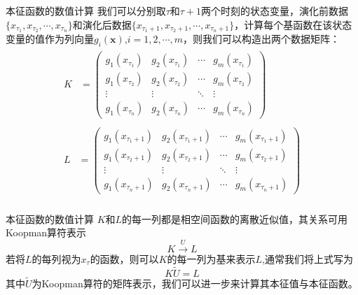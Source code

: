 \documentclass{beamer}
\begin{document}
     	\begin{frame}{本征函数的数值计算}
     		我们可以分别取$\tau$和$\tau+1$两个时刻的状态变量，演化前数据$\{x_{\tau_1},x_{\tau_2},\cdots,x_{\tau_n}\}$和演化后数据$\{x_{\tau_1+1},x_{\tau_2+1},\cdots,x_{\tau_n+1}\}$，计算每个基函数在该状态变量的值作为列向量${g_i(\mathbf{x})}$,$i=1,2,\cdots,m$，则我们可以构造出两个数据矩阵：
     		\begin{gather}
     			\begin{aligned}
     			K&=\begin{pmatrix}
     			g_1(x_{\tau_1})&g_2(x_{\tau_1})&\cdots&g_m(x_{\tau_1})\\
     			g_1(x_{\tau_2})&g_2(x_{\tau_2})&\cdots&g_m(x_{\tau_2})\\
     			\vdots&\vdots&\ddots&\vdots\\
     			g_1(x_{\tau_n})&g_2(x_{\tau_n})&\cdots&g_m(x_{\tau_n})
     			\end{pmatrix}
     			\end{aligned}\\
     			\begin{aligned}
     			L&=\begin{pmatrix}
     			g_1(x_{\tau_1+1})&g_2(x_{\tau_1+1})&\cdots&g_m(x_{\tau_1+1})\\
     			g_1(x_{\tau_2+1})&g_2(x_{\tau_2+1})&\cdots&g_m(x_{\tau_2+1})\\
     			\vdots&\vdots&\ddots&\vdots\\
     			g_1(x_{\tau_n+1})&g_2(x_{\tau_n+1})&\cdots&g_m(x_{\tau_n+1})
     			\end{pmatrix}\\
     			\end{aligned}
     		\end{gather}
     	\end{frame}
     	\begin{frame}{本征函数的数值计算}
     		$K$和$L$的每一列都是相空间函数的离散近似值，其关系可用Koopman算符表示
     		$$K\stackrel{U}{\longrightarrow}L$$
     		若将$L$的每列视为$x_\tau$的函数，则可以$K$的每一列为基来表示$L$,通常我们将上式写为
     		$$K\tilde{U}=L$$
     		其中$\tilde{U}$为Koopman算符的矩阵表示，我们可以进一步来计算其本征值与本征函数。
     	\end{frame}
\end{document}
